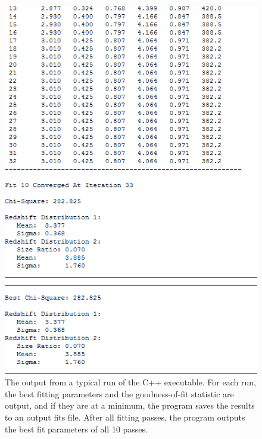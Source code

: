 \documentclass[twocolumn,letterpaper,10pt]{article}
\begin{document}
\begin{figure}
  \centering
  \includegraphics{fitting2.png}
  \caption{The output from a typical run of the C++ executable. For each run, the best fitting parameters and the goodness-of-fit statistic are output, and if they are at a minimum, the program saves the results to an output fits file. After all fitting passes, the program outputs the best fit parameters of all 10 passes.}
  \label{disp:fit}
\end{figure}
\end{document}
